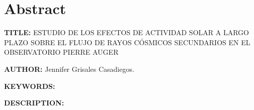 \newpage
\chapter*{Abstract}
\label{sec:abst}
\footnotesize{
\noindent\textbf{TITLE:} ESTUDIO DE LOS EFECTOS DE ACTIVIDAD SOLAR A LARGO PLAZO
SOBRE EL FLUJO DE RAYOS CÓSMICOS SECUNDARIOS EN EL OBSERVATORIO PIERRE AUGER

\noindent\textbf{AUTHOR:} Jennifer Grisales Casadiegos.

\noindent\textbf{KEYWORDS: } 

\noindent\textbf{DESCRIPTION:} 



}\normalsize
\clearpage